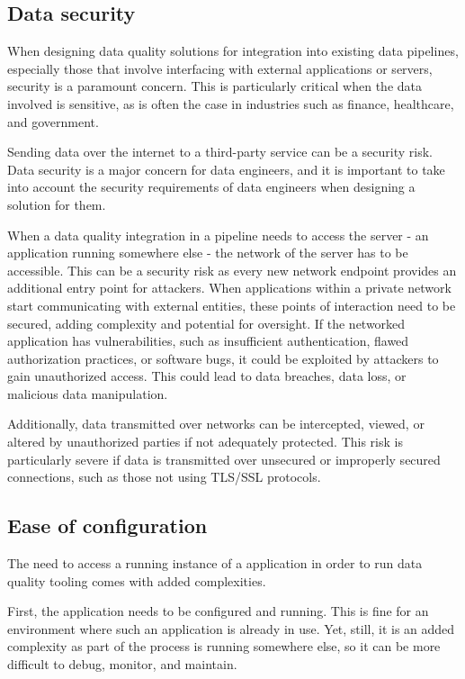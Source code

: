 \subsection{Data security}

When designing data quality solutions for integration into existing data pipelines, especially those that involve interfacing with external applications or servers, security is a paramount concern. This is particularly critical when the data involved is sensitive, as is often the case in industries such as finance, healthcare, and government.

 Sending data over the internet to a third-party service can be a security risk. Data security is a major concern for data engineers, and it is important to take into account the security requirements of data engineers when designing a solution for them.

When a data quality integration in a pipeline needs to access the server - an application running somewhere else - the network of the server has to be accessible. This can be a security risk as every new network endpoint provides an additional entry point for attackers. When applications within a private network start communicating with external entities, these points of interaction need to be secured, adding complexity and potential for oversight.  If the networked application has vulnerabilities, such as insufficient authentication, flawed authorization practices, or software bugs, it could be exploited by attackers to gain unauthorized access. This could lead to data breaches, data loss, or malicious data manipulation. 


Additionally, data transmitted over networks can be intercepted, viewed, or altered by unauthorized parties if not adequately protected. This risk is particularly severe if data is transmitted over unsecured or improperly secured connections, such as those not using TLS/SSL protocols. 

\subsection{Ease of configuration}

The need to access a running instance of a  application in order to run data quality tooling comes with added complexities.

First, the application needs to be configured and running. This is fine for an environment where such an application is already in use. Yet, still, it is an added complexity as part of the process is running somewhere else, so it can be more difficult to debug, monitor, and maintain.

